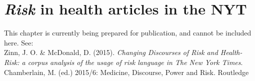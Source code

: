 \documentclass{report}
\begin{document}




\chapter{\emph{Risk} in health articles in the NYT}

    This chapter is currently being prepared for publication, and cannot be included here. See: \\ 

    Zinn, J. O. \& McDonald, D. (2015). \emph{Changing Discourses of Risk and Health-Risk: a corpus analysis of the usage of risk language in The New York Times}. Chamberlain, M. (ed.) 2015/6: Medicine, Discourse, Power and Risk. Routledge




    \cleardoublepage
    \singlespacing
    \printendnotes
    \cleardoublepage
    \singlespacing
    
    
    \cleardoublepage

    
\end{document}

